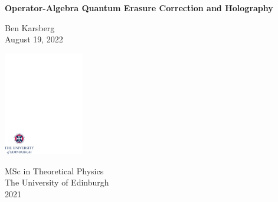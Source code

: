 \documentclass[12pt,a4paper]{report}
\numberwithin{equation}{section}
\theoremstyle{definition}
\theoremstyle{theorem}
\theoremstyle{theorem}
\theoremstyle{example}
\theoremstyle{definition}
\begin{document}
\thispagestyle{empty}

%

\parindent=0pt          %
\parskip=5pt            %


\vspace*{0.1\textheight}

\begin{center}
        \huge{\bfseries Operator-Algebra Quantum Erasure Correction and Holography}\\
\end{center}

\bigskip

\begin{center}
        \large{Ben Karsberg}\\  %
        \bigskip
        \large{August 19, 2022}  %
\end{center}


\vspace*{0.3\textheight}

\begin{center}
        \includegraphics[width=35mm]{crest.pdf}
\end{center}

\medskip

\begin{center}

\large{
  MSc in Theoretical Physics\\[0.8ex]
  The University of Edinburgh\\[0.8ex]
  2021
}

\end{center}
\end{document}
